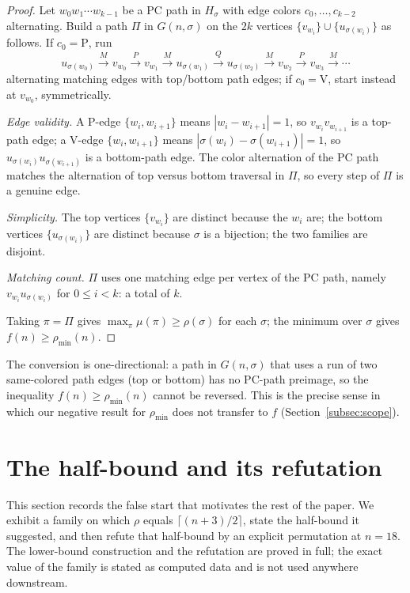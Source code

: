 \documentclass[11pt]{article}
\theoremstyle{definition}
\newcommand{\pmin}{\rho_{\min}}
\begin{document}
\begin{proof}
Let $w_0 w_1 \cdots w_{k-1}$ be a PC path in $H_\sigma$ with edge colors
$c_0,\dots,c_{k-2}$ alternating. Build a path $\Pi$ in $G(n,\sigma)$ on the $2k$
vertices $\{v_{w_i}\} \cup \{u_{\sigma(w_i)}\}$ as follows. If $c_0 = \mathrm P$, run
\[
  u_{\sigma(w_0)} \xrightarrow{M} v_{w_0} \xrightarrow{P} v_{w_1} \xrightarrow{M}
  u_{\sigma(w_1)} \xrightarrow{Q} u_{\sigma(w_2)} \xrightarrow{M} v_{w_2}
  \xrightarrow{P} v_{w_3} \xrightarrow{M} \cdots
\]
alternating matching edges with top/bottom path edges; if $c_0 = \mathrm V$, start
instead at $v_{w_0}$, symmetrically.

\emph{Edge validity.} A P-edge $\{w_i,w_{i+1}\}$ means $|w_i - w_{i+1}| = 1$, so
$v_{w_i} v_{w_{i+1}}$ is a top-path edge; a V-edge $\{w_i,w_{i+1}\}$ means
$|\sigma(w_i) - \sigma(w_{i+1})| = 1$, so $u_{\sigma(w_i)} u_{\sigma(w_{i+1})}$ is a
bottom-path edge. The color alternation of the PC path matches the alternation of top
versus bottom traversal in $\Pi$, so every step of $\Pi$ is a genuine edge.

\emph{Simplicity.} The top vertices $\{v_{w_i}\}$ are distinct because the $w_i$ are;
the bottom vertices $\{u_{\sigma(w_i)}\}$ are distinct because $\sigma$ is a bijection;
the two families are disjoint.

\emph{Matching count.} $\Pi$ uses one matching edge per vertex of the PC path, namely
$v_{w_i} u_{\sigma(w_i)}$ for $0\le i<k$: a total of $k$.

Taking $\pi=\Pi$ gives $\max_\pi\mu(\pi)\ge\rho(\sigma)$ for each $\sigma$; the
minimum over $\sigma$ gives $f(n)\ge\pmin(n)$.
\end{proof}

The conversion is one-directional: a path in $G(n,\sigma)$ that uses a run of two
same-colored path edges (top or bottom) has no PC-path preimage, so the inequality
$f(n)\ge\pmin(n)$ cannot be reversed. This is the precise sense in which our negative
result for $\pmin$ does not transfer to $f$ (Section~\ref{subsec:scope}).

\section{The half-bound and its refutation}\label{sec:halfbound}

This section records the false start that motivates the rest of the paper. We exhibit a
family on which $\rho$ equals $\lceil(n+3)/2\rceil$, state the half-bound it suggested,
and then refute that half-bound by an explicit permutation at $n=18$. The
lower-bound construction and the refutation are proved in full; the exact value of the
family is stated as computed data and is not used anywhere downstream.
\end{document}
